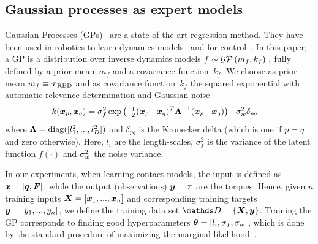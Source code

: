 \subsection{Gaussian processes as expert models}
	Gaussian Processes (GPs)~\cite{Rasmussen2006} are a state-of-the-art regression method.
	They have been used in robotics to learn dynamics models~\cite{Deisenroth2012} and for control~\cite{Deisenroth2014}.
    In this paper, a GP is a distribution over inverse dynamics models 
		\mbox{$f \sim \mathcal{GP} \left( m_f,k_f \right) \,,$}
	fully defined by a prior mean~$m_f$ and a covariance function~$k_f$.
	We choose as prior mean $m_f \equiv \boldsymbol{\tau}_\text{RBD}$ and as covariance function~$k_f$ the squared exponential with automatic relevance determination and Gaussian noise
	\begin{align*}
		{k(\vec x_p,\vec x_q)} &= \sigma_f^2\exp\left(\!-\!\tfrac{1}{2}(\vec x_p\! -\!\vec x_q)^T {\mat \Lambda\inv} (\vec x_p \!-\! \vec x_q)\right) \!+\! \sigma_\noise^2\delta_{pq}
	\end{align*}
	where ${\boldsymbol \Lambda}=\operatorname{\mathrm{diag}}([l^2_1,...,l^2_D])$ and $\delta_{pq}$ is the Kronecker delta (which is one if $p=q$ and zero otherwise). Here, $l_i$ are the length-scales, $\sigma^2_f$ is the variance of the latent function $f(\cdot)$ and $\sigma^2_w$ the noise variance. 
 
    In our experiments, when learning contact models, the input is defined as $\boldsymbol{x} = [\boldsymbol q,\boldsymbol{F}]$, while the output (observations) $\boldsymbol{y} = \boldsymbol{\tau}$ are the torques.
    Hence, given $n$ training inputs $\boldsymbol X=[\boldsymbol{x}_1,...,\boldsymbol{x}_n]$ and corresponding training targets $\boldsymbol y=[ y_1,..., y_n]$, we define the training data set $\dataset = \{\mat X,\mat y\}$. 
Training the GP corresponds to finding good hyperparameters $\boldsymbol{\theta} = [l_i, \sigma_f, \sigma_w]$, which is done by the standard procedure of maximizing the marginal likelihood~\cite{Rasmussen2006}.   
    
